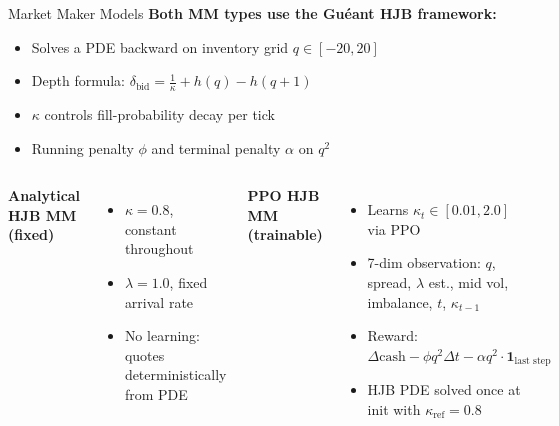 \documentclass[10pt,aspectratio=169]{beamer}
\begin{document}
\begin{frame}{Market Maker Models}
  \textbf{Both MM types use the Gu\'eant HJB framework:}
  \begin{itemize}
    \item Solves a PDE backward on inventory grid $q \in [-20, 20]$
    \item Depth formula: $\delta_{\text{bid}} = \frac{1}{\kappa} + h(q) - h(q+1)$
    \item $\kappa$ controls fill-probability decay per tick
    \item Running penalty $\phi$ and terminal penalty $\alpha$ on $q^2$
  \end{itemize}

  \vspace{8pt}
  \begin{columns}[T]
    \textbf{Analytical HJB MM (fixed)}
    \begin{itemize}
      \item $\kappa = 0.8$, constant throughout
      \item $\lambda = 1.0$, fixed arrival rate
      \item No learning: quotes deterministically from PDE
    \end{itemize}

    \textbf{PPO HJB MM (trainable)}
    \begin{itemize}
      \item Learns $\kappa_t \in [0.01, 2.0]$ via PPO
      \item 7-dim observation: $q$, spread, $\lambda$ est., mid vol, imbalance, $t$, $\kappa_{t-1}$
      \item Reward: $\Delta\text{cash} - \phi q^2 \Delta t - \alpha q^2\cdot\mathbf{1}_{\text{last step}}$
      \item HJB PDE solved once at init with $\kappa_{\text{ref}} = 0.8$
    \end{itemize}
  \end{columns}
\end{frame}
\end{document}
